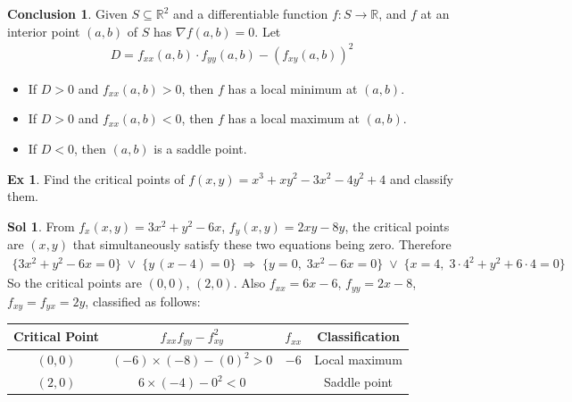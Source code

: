 \documentclass[12pt]{extarticle}
\newcommand{\ds}{\displaystyle}
\newcommand{\ie}{\;\Longrightarrow\;}
\newcommand{\orr}{\;\vee\;}
\theoremstyle{definition}
\newtheorem*{fact}{Conclusion}
\newtheorem*{ex}{Ex}
\newtheorem*{sol}{Sol}
\begin{document}
\begin{fact}
  Given $\ds S\subseteq\mathbb{R}^2$ and a differentiable function $\ds f:S\to\mathbb{R}$, and $f$ at an interior point $(a, b)$ of $S$ has $\ds\nabla f(a, b) = 0$. Let 
  \begin{align*}
    D = f_{xx}(a, b)\cdot f_{yy}(a, b) - (f_{xy}(a, b))^2
  \end{align*}
  \begin{itemize}\setlength\itemsep{0em}
    \item If $D > 0$ and $\ds f_{xx}(a, b) > 0$, then $f$ has a local minimum at $(a, b)$. 
    \item If $D > 0$ and $\ds f_{xx}(a, b) < 0$, then $f$ has a local maximum at $(a, b)$. 
    \item If $D < 0$, then $(a, b)$ is a saddle point. 
  \end{itemize}
\end{fact}

\begin{ex} 
  Find the critical points of $\ds f(x, y) = x^3 + xy^2 - 3x^2 - 4y^2 + 4$ and classify them. 
\end{ex}

\begin{sol} From $\ds f_x(x, y) = 3x^2 + y^2 - 6x$, $\ds f_y(x, y) = 2xy - 8y$, the critical points are $(x, y)$ that simultaneously satisfy these two equations being zero. Therefore 
  \begin{align*}
    \big\{3x^2 + y^2 - 6x = 0\big\} \orr \big\{y\,(x - 4) = 0\big\} \ie \big\{y = 0,\;3x^2 - 6x = 0\big\}\orr\big\{x = 4,\;3\cdot 4^2 + y^2 + 6\cdot 4 = 0\big\}
  \end{align*}
  So the critical points are $(0, 0)$, $(2, 0)$. Also $\ds f_{xx} = 6x - 6$, $\ds f_{yy} = 2x - 8$, $\ds f_{xy} = f_{yx} = 2y$, classified as follows: 
  \begin{center}
  \renewcommand{\arraystretch}{1.3}
  \begin{tabular}{cccc}
    \toprule
    Critical Point   & $f_{xx}f_{yy}-f_{xy}^2$ & $f_{xx}$ & Classification \\    
    \midrule
    $(0, 0)$ & $(-6)\times(-8) - (0)^2 > 0$ & $-6$ & Local maximum \\ 
    $(2, 0)$ & $6\times(-4) - 0^2 < 0$      &      & Saddle point \\ \bottomrule
  \end{tabular}
  \renewcommand{\arraystretch}{1.0}
  \end{center}
\end{sol}
\end{document}
